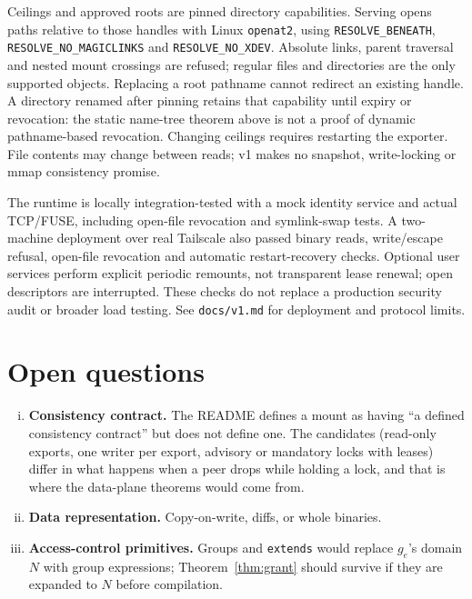 \documentclass[11pt]{article}
\theoremstyle{definitionbreak}
\theoremstyle{plainbreak}
\theoremstyle{remarkbreak}
\begin{document}
Ceilings and approved roots are pinned directory capabilities. Serving opens paths relative
to those handles with Linux \texttt{openat2}, using \texttt{RESOLVE\_BENEATH},
\texttt{RESOLVE\_NO\_MAGICLINKS} and \texttt{RESOLVE\_NO\_XDEV}. Absolute links, parent
traversal and nested mount crossings are refused; regular files and directories are the only
supported objects. Replacing a root pathname cannot redirect an existing handle. A directory
renamed after pinning retains that capability until expiry or revocation: the static
name-tree theorem above is not a proof of dynamic pathname-based revocation. Changing ceilings
requires restarting the exporter. File contents may change between reads; v1 makes no snapshot,
write-locking or mmap consistency promise.

The runtime is locally integration-tested with a mock identity service and actual TCP/FUSE,
including open-file revocation and symlink-swap tests. A two-machine deployment over real
Tailscale also passed binary reads, write/escape refusal, open-file revocation and automatic
restart-recovery checks. Optional user services perform explicit periodic remounts, not
transparent lease renewal; open descriptors are interrupted. These checks do not replace a
production security audit or broader load testing. See \texttt{docs/v1.md} for deployment and
protocol limits.

\section{Open questions}\label{sec:open}

\begin{enumerate}[(i)]
    \item \textbf{Consistency contract.} The README defines a mount as having ``a defined
    consistency contract'' but does not define one. The candidates (read-only exports,
    one writer per export, advisory or mandatory locks with leases) differ in what happens when
    a peer drops while holding a lock, and that is where the data-plane theorems would come
    from.
    \item \textbf{Data representation.} Copy-on-write, diffs, or whole binaries.
    \item \textbf{Access-control primitives.} Groups and \texttt{extends} would replace $g_e$'s
    domain $N$ with group expressions; Theorem~\ref{thm:grant} should survive if they are
    expanded to $N$ before compilation.
\end{enumerate}
\end{document}
